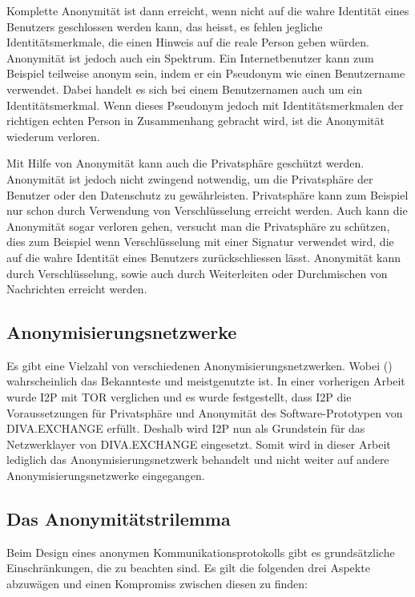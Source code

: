 Komplette Anonymität ist dann erreicht, wenn nicht auf die wahre Identität eines Benutzers geschlossen werden kann,
das heisst, es fehlen jegliche Identitätsmerkmale, die einen Hinweis auf die reale Person geben würden.
Anonymität ist jedoch auch ein Spektrum.
Ein Internetbenutzer kann zum Beispiel teilweise anonym sein, indem er ein Pseudonym wie einen Benutzername verwendet.
Dabei handelt es sich bei einem Benutzernamen auch um ein Identitätsmerkmal.
Wenn dieses Pseudonym jedoch mit Identitätsmerkmalen der richtigen echten Person in Zusammenhang gebracht wird,
ist die Anonymität wiederum verloren. \parencite[S. 8-9]{maric_untersuchung_2020}

Mit Hilfe von Anonymität kann auch die Privatsphäre geschützt werden.
Anonymität ist jedoch nicht zwingend notwendig, um die Privatsphäre der Benutzer oder den Datenschutz zu gewährleisten.
Privatsphäre kann zum Beispiel nur schon durch Verwendung von Verschlüsselung erreicht werden.
Auch kann die Anonymität sogar verloren gehen, versucht man die Privatsphäre zu schützen,
dies zum Beispiel wenn Verschlüsselung mit einer Signatur verwendet wird, die auf die wahre Identität eines Benutzers zurückschliessen lässt.
Anonymität kann durch Verschlüsselung, sowie auch durch Weiterleiten oder Durchmischen von Nachrichten erreicht werden.

\subsection{Anonymisierungsnetzwerke}

Es gibt eine Vielzahl von verschiedenen Anonymisierungsnetzwerken.
Wobei  () wahrscheinlich das Bekannteste und meistgenutzte ist.
In einer vorherigen Arbeit wurde I2P mit TOR verglichen und es wurde festgestellt, dass I2P die Voraussetzungen für Privatsphäre und Anonymität des Software-Prototypen von DIVA.EXCHANGE \parencite[S.~28-30]{maric_untersuchung_2020} erfüllt.
Deshalb wird I2P nun als Grundstein für das Netzwerklayer von DIVA.EXCHANGE eingesetzt.
Somit wird in dieser Arbeit lediglich das Anonymisierungsnetzwerk  behandelt und nicht weiter auf andere Anonymisierungsnetzwerke eingegangen.

\subsection{Das Anonymitätstrilemma}\label{sec:anonymitytrilemma}

Beim Design eines anonymen Kommunikationsprotokolls gibt es grundsätzliche Einschränkungen, die zu beachten sind.
Es gilt die folgenden drei Aspekte abzuwägen und einen Kompromiss zwischen diesen zu finden:

